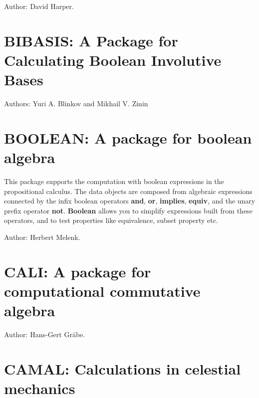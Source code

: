Author: David Harper.



\newpage

\section{BIBASIS: A Package for Calculating Boolean Involutive Bases}
 \label{BIBASIS}

Authors: Yuri A. Blinkov and Mikhail V. Zinin



\newpage

\section{BOOLEAN: A package for boolean algebra} 

This package supports the computation with boolean expressions in the
propositional calculus.  The data objects are composed from algebraic
expressions connected by the infix boolean operators {\bf and}, {\bf or},
{\bf implies}, {\bf equiv}, and the unary prefix operator {\bf not}.
{\bf Boolean} allows you to simplify expressions built from these
operators, and to test properties like equivalence, subset property etc.

Author: Herbert Melenk.



\newpage

\section{CALI: A package for computational commutative algebra}

\iffalse
This package contains algorithms for computations in commutative algebra
closely related to the Gr\"obner algorithm for ideals and modules.  Its
heart is a new implementation of the Gr\"obner algorithm that also allows
for the computation of syzygies.  This implementation is also applicable to
submodules of free modules with generators represented as rows of a matrix.
\fi
Author: Hans-Gert Gr\"abe.



\newpage

\section{CAMAL: Calculations in celestial mechanics}
\label{CAMAL}

